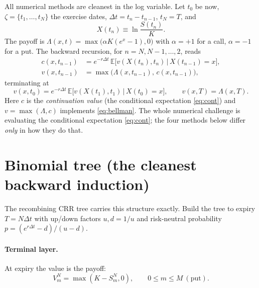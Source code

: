 \documentclass[11pt]{article}
\newcommand{\E}{\mathbb{E}}
\begin{document}
All numerical methods are cleanest in the log variable. Let $t_0$ be now, $\zeta=\{t_1,\dots,t_N\}$ the
exercise dates, $\Delta t=t_n-t_{n-1}$, $t_N=T$, and
\begin{equation}\label{eq:logvar}
X(t_n)\equiv\ln\!\frac{S(t_n)}{K}.
\end{equation}
The payoff is $\Lambda(x,t)=\max\!\big(\alpha K(e^x-1),0\big)$ with $\alpha=+1$ for a call, $\alpha=-1$ for a
put. The backward recursion, for $n=N,N-1,\dots,2$, reads
\begin{align}
c(x,t_{n-1})&=e^{-r\Delta t}\,\E\!\big[v(X(t_n),t_n)\,\big|\,X(t_{n-1})=x\big],\label{eq:cont}\\
v(x,t_{n-1})&=\max\!\big(\Lambda(x,t_{n-1}),\,c(x,t_{n-1})\big),\label{eq:vmax}
\end{align}
terminating at
\begin{equation}
v(x,t_0)=e^{-r\Delta t}\,\E\!\big[v(X(t_1),t_1)\,\big|\,X(t_0)=x\big],
\qquad v(x,T)=\Lambda(x,T).
\end{equation}
Here $c$ is the \emph{continuation value} (the conditional expectation \eqref{eq:cont}) and
$v=\max(\Lambda,c)$ implements \eqref{eq:bellman}. The whole numerical challenge is evaluating the conditional
expectation \eqref{eq:cont}; the four methods below differ \emph{only} in how they do that.

\section{Binomial tree (the cleanest backward induction)}\label{sec:tree}

The recombining CRR tree carries this structure exactly. Build the tree to expiry $T=N\Delta t$ with
up/down factors $u,d=1/u$ and risk-neutral probability $p=(e^{r\Delta t}-d)/(u-d)$.

\paragraph{Terminal layer.} At expiry the value is the payoff:
\begin{equation}
V_m^N=\max(K-S_m^N,0),\qquad 0\le m\le M\ (\text{put}).
\end{equation}
\end{document}
